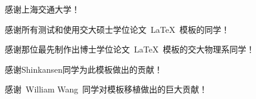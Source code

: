 
\begin{thanks}

  感谢上海交通大学！
  
  感谢所有测试和使用交大硕士学位论文~\LaTeX~模板的同学！

  感谢那位最先制作出博士学位论文~\LaTeX~模板的交大物理系同学！

  感谢Shinkansen同学为此模板做出的贡献！

  感谢~William Wang~同学对模板移植做出的巨大贡献！


\end{thanks}

